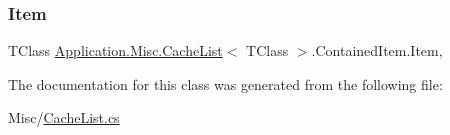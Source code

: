 \mbox{\label{class_application_1_1_misc_1_1_cache_list_1_1_contained_item_a7799bd7352a769f1f7ff540d369d4743}} 
\subsubsection{\texorpdfstring{Item}{Item}}
{\footnotesize\ttfamily T\+Class \mbox{\hyperlink{class_application_1_1_misc_1_1_cache_list}{Application.\+Misc.\+Cache\+List}}$<$ T\+Class $>$.Contained\+Item.\+Item\hspace{0.3cm}{\ttfamily [get]}, {\ttfamily [set]}}



The documentation for this class was generated from the following file\+:\begin{DoxyCompactItemize}
\item 
Misc/\mbox{\hyperlink{_cache_list_8cs}{Cache\+List.\+cs}}\end{DoxyCompactItemize}
